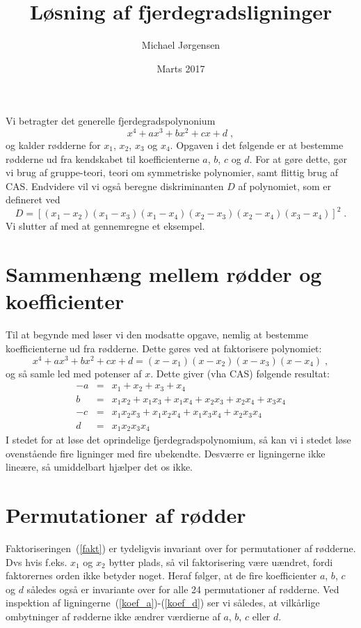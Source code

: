 \documentclass[12pt,oneside,a4paper]{article}
\title{Løsning af fjerdegradsligninger}
\date{Marts 2017}
\author{Michael Jørgensen}
\newcommand{\bea}{\begin{eqnarray}}
\newcommand{\eea}{\end{eqnarray}}
\begin{document}
\maketitle
Vi betragter det generelle fjerdegradspolynonium
\begin{equation}
    x^4 + ax^3 + bx^2 + cx + d\;,
\end{equation}
og kalder rødderne for $x_1$, $x_2$, $x_3$ og $x_4$.
Opgaven i det følgende er at bestemme rødderne ud fra kendskabet til
koefficienterne $a$, $b$, $c$ og $d$.
For at gøre dette, gør vi brug af gruppe-teori, teori om
symmetriske polynomier, samt flittig brug af CAS.
Endvidere vil vi også beregne diskriminanten $D$ af polynomiet, som 
er defineret ved
\begin{equation}
    D =
    \left[(x_1-x_2)(x_1-x_3)(x_1-x_4)(x_2-x_3)(x_2-x_4)(x_3-x_4)\right]^2\;.
    \label{eq_dis4}
\end{equation}
Vi slutter af med at gennemregne et eksempel.

\section{Sammenhæng mellem rødder og koefficienter}
Til at begynde med løser vi den modsatte opgave, nemlig at bestemme
koefficienterne ud fra rødderne. Dette gøres ved at faktorisere polynomiet:
\begin{equation}
    x^4 + ax^3 + bx^2 + cx + d = (x-x_1)(x-x_2)(x-x_3)(x-x_4)\;,
    \label{fakt}
\end{equation}
og så samle led med potenser af $x$.
Dette giver (vha CAS) følgende resultat:
\bea
  -a &=& x_1 + x_2 + x_3 + x_4 \label{koef_a} \\
   b &=& x_1x_2 + x_1x_3 + x_1x_4 + x_2x_3 + x_2x_4 + x_3x_4  \label{koef_b}\\
  -c &=& x_1x_2x_3 + x_1x_2x_4 + x_1x_3x_4 + x_2x_3x_4  \label{koef_c}\\
   d &=& x_1x_2x_3x_4 \label{koef_d}
\eea
I stedet for at løse det oprindelige fjerdegradspolynomium, så kan vi i stedet løse ovenstående fire ligninger med fire ubekendte. Desværre er ligningerne ikke lineære, så umiddelbart hjælper det os ikke.

\section{Permutationer af rødder}
Faktoriseringen~(\ref{fakt}) er tydeligvis invariant over for permutationer af
rødderne. Dvs hvis f.eks. $x_1$ og $x_2$ bytter plads, så vil faktorisering være
uændret, fordi faktorernes orden ikke betyder noget.
Heraf følger, at de fire koefficienter $a$, $b$, $c$ og $d$ således også er
invariante over for alle 24 permutationer af rødderne. Ved inspektion af
ligningerne~(\ref{koef_a})-(\ref{koef_d}) ser vi således, at vilkårlige
ombytninger af rødderne ikke ændrer værdierne af $a$, $b$, $c$ eller $d$.
\end{document}
